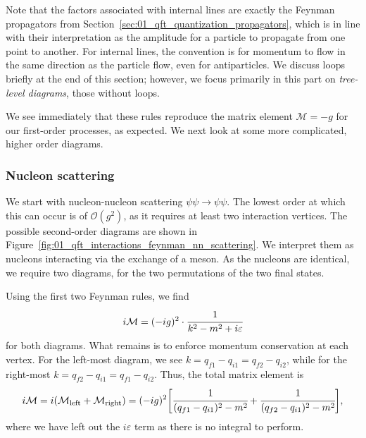 Note that the factors associated with internal lines are exactly the Feynman propagators from Section~\ref{sec:01_qft_quantization_propagators}, which is in line with their interpretation as the amplitude for a particle to propagate from one point to another.
For internal lines, the convention is for momentum to flow in the same direction as the particle flow, even for antiparticles.
We discuss loops briefly at the end of this section; however, we focus primarily in this part on \textit{tree-level diagrams}, those without loops.

We see immediately that these rules reproduce the matrix element $\mathcal M = -g$ for our first-order processes, as expected.
We next look at some more complicated, higher order diagrams.


\subsubsection{Nucleon scattering}

We start with nucleon-nucleon scattering $\psi\psi \rightarrow \psi\psi$.
The lowest order at which this can occur is of $\mathcal O(g^2)$, as it requires at least two interaction vertices.
The possible second-order diagrams are shown in Figure~\ref{fig:01_qft_interactions_feynman_nn_scattering}.
We interpret them as nucleons interacting via the exchange of a meson.
As the nucleons are identical, we require two diagrams, for the two permutations of the two final states.



Using the first two Feynman rules, we find
\begin{equation}
	\label{eq:01_qft_interactions_nn_scattering_1}
	i \mathcal M = (-ig)^2 \cdot  \cfrac{1}{k^2 - m^2 + i\varepsilon}
\end{equation}
for both diagrams.
What remains is to enforce momentum conservation at each vertex.
For the left-most diagram, we see $k = q_{f1} - q_{i1} = q_{f2} - q_{i2}$, while for the right-most $k = q_{f2} - q_{i1} = q_{f1} - q_{i2}$.
Thus, the total matrix element is
\begin{equation}
	\label{eq:01_qft_interactions_nn_scattering_2}
	i \mathcal M = i(\mathcal M_{\mathrm{left}} + \mathcal M_{\mathrm{right}}) = (-ig)^2 \bigg[ \cfrac{1}{(q_{f1} - q_{i1})^2 - m^2} + \cfrac{1}{(q_{f2} - q_{i1})^2 - m^2} \bigg],
\end{equation}
where we have left out the $i\varepsilon$ term as there is no integral to perform.

